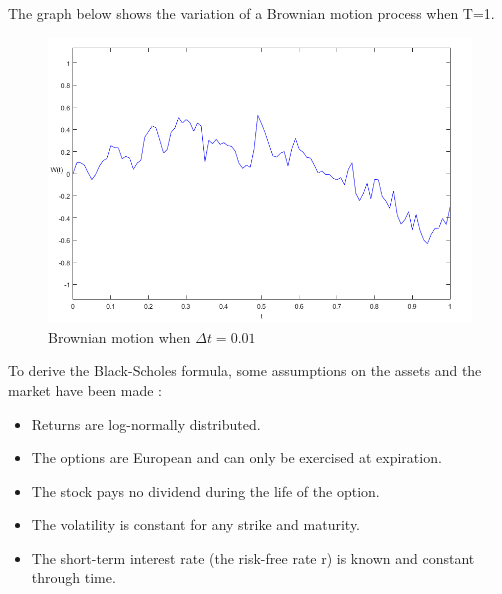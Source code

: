 \documentclass[12pt]{report}
\begin{document}
The graph below shows the variation of a Brownian motion  process when T=1.
\begin{figure}[h]
\centering
\includegraphics[scale=0.5]{brownian.png} 
\caption{Brownian motion when $\Delta t=0.01$
}
\end{figure} 


To derive the Black-Scholes formula, some assumptions on the assets and the market have been made  :
\begin{itemize}
\item Returns are log-normally distributed.
\item The options are European and can only be exercised at expiration.
\item The stock pays no dividend during the life of the option.
\item The volatility is constant for any strike and maturity.
\item The short-term interest rate (the risk-free rate r) is known and constant through time.
\end{itemize} 
\end{document}
